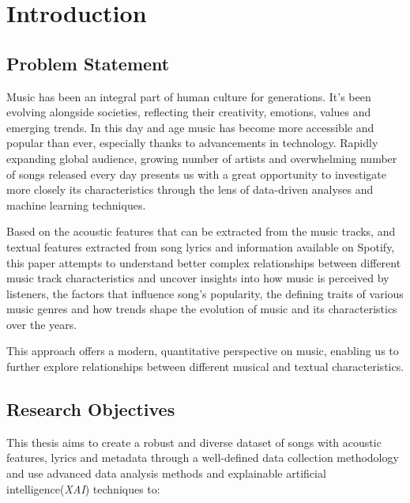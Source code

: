 \chapter{Introduction}
\label{cha:introduction}

\section{Problem Statement}
\label{sec:problemstatement}
Music has been an integral part of human culture for
generations. It's been evolving alongside societies, reflecting their
creativity, emotions, values and emerging trends. In this day and age music has
become more accessible and popular than ever, especially thanks to advancements
in technology. Rapidly expanding global audience, growing number of artists and
overwhelming number of songs released every day presents us with a great
opportunity to investigate more closely its characteristics through the lens of
data-driven analyses and machine learning techniques. 

Based on the acoustic features that can be extracted from the music tracks, and
textual features extracted from song lyrics and information available on
Spotify, this paper attempts to understand better complex relationships between
different music track characteristics and uncover insights into how music is
perceived by listeners, the factors that influence song's popularity, the
defining traits of various music genres and how trends shape the evolution of
music and its characteristics over the years. 

This approach offers a modern, quantitative perspective on music, enabling us
to further explore relationships between different musical and textual
characteristics.






\section{Research Objectives}
\label{sec:researchobjectives}
This thesis aims to create a robust and diverse dataset of songs with acoustic
features, lyrics and metadata through a well-defined data collection
methodology and use advanced data analysis methods and explainable artificial
intelligence(\textit{XAI}) techniques to:

